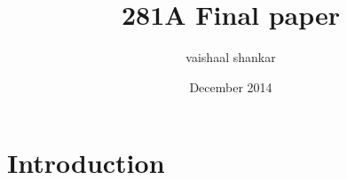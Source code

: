 \documentclass{article}
\title{281A Final paper}
\author{vaishaal shankar}
\date{December 2014}
\begin{document}
\maketitle

\section{Introduction}
\end{document}
